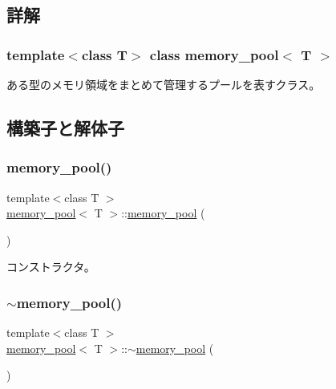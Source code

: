 \subsection{詳解}
\subsubsection*{template$<$class T$>$\newline
class memory\+\_\+pool$<$ T $>$}

ある型のメモリ領域をまとめて管理するプールを表すクラス。 

\subsection{構築子と解体子}
\hypertarget{classmemory__pool_aefcedeb50bbee5b4b55add4cff1dc1cd}{}\label{classmemory__pool_aefcedeb50bbee5b4b55add4cff1dc1cd} 
\subsubsection{\texorpdfstring{memory\+\_\+pool()}{memory\_pool()}\hspace{0.1cm}{\footnotesize\ttfamily [1/3]}}
{\footnotesize\ttfamily template$<$class T $>$ \\
\hyperlink{classmemory__pool}{memory\+\_\+pool}$<$ T $>$\+::\hyperlink{classmemory__pool}{memory\+\_\+pool} (\begin{DoxyParamCaption}{ }\end{DoxyParamCaption})}

コンストラクタ。 \hypertarget{classmemory__pool_a3431323fb4ac4b685b0e7a6c1da2094d}{}\label{classmemory__pool_a3431323fb4ac4b685b0e7a6c1da2094d} 
\subsubsection{\texorpdfstring{$\sim$memory\+\_\+pool()}{~memory\_pool()}}
{\footnotesize\ttfamily template$<$class T $>$ \\
\hyperlink{classmemory__pool}{memory\+\_\+pool}$<$ T $>$\+::$\sim$\hyperlink{classmemory__pool}{memory\+\_\+pool} (\begin{DoxyParamCaption}{ }\end{DoxyParamCaption})\hspace{0.3cm}{\ttfamily [virtual]}}

